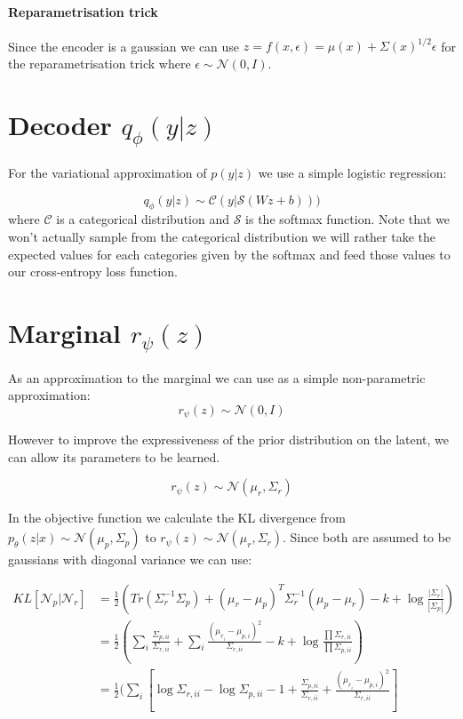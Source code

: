 \documentclass[10pt,oneside,openright]{report}
\begin{document}
\paragraph{Reparametrisation trick}
Since the encoder is a gaussian we can use  $z = f(x, \epsilon) =  \mu(x) + \Sigma(x)^{1/2} \epsilon$ for the reparametrisation trick where $\epsilon \sim \mathcal{N}(0, I)$. 
 
\section{Decoder $q_\phi(y|z)$}
For the variational approximation of $p(y|z)$ we use a simple logistic regression:

$$ q_\phi(y|z) \sim \mathcal{C}(y| \mathcal{S}(Wz + b)))$$ where $\mathcal{C}$ is a categorical distribution and $\mathcal{S}$ is the softmax function. Note that we won't actually sample from the categorical distribution we will rather take the expected values for each categories given by the softmax and feed those values to our cross-entropy loss function.

\section{Marginal $r_\psi(z)$}

As an approximation to the marginal we can use as a simple non-parametric approximation:
$$r_\psi(z) \sim \mathcal{N}(0, I)$$

However to improve the expressiveness of the prior distribution on the latent, we can allow its parameters to be learned. 

$$r_\psi(z) \sim \mathcal{N}(\mu_r, \Sigma_r)$$

In the objective function we calculate the KL divergence from $p_\theta(z|x) \sim \mathcal{N}(\mu_p, \Sigma_p)$ to $r_\psi(z) \sim \mathcal{N}(\mu_r, \Sigma_r)$. Since both are assumed to be gaussians with diagonal variance we can use:

\begin{align}
KL[\mathcal{N}_p| \mathcal{N}_r] &= \frac{1}{2}(Tr(\Sigma_r^{-1}\Sigma_p) + (\mu_r - \mu_p)^T\Sigma_r^{-1}(\mu_p - \mu_r) - k + \log\frac{|\Sigma_r|}{|\Sigma_p|})\\
&= \frac{1}{2}(\sum_i \frac{\Sigma_{p, ii}}{\Sigma_{r, ii}} + \sum_i \frac{(\mu_{r_i} - \mu_{p, i})^2}{\Sigma_{r, ii}} - k + \log\frac{\prod \Sigma_{r, ii}}{\prod \Sigma_{p, ii}})\\
&= \frac{1}{2}(\sum_i[ \log \Sigma_{r, ii} - \log \Sigma_{p, ii} - 1 + \frac{\Sigma_{p, ii}}{\Sigma_{r, ii}} + \frac{(\mu_{r_i} - \mu_{p, i})^2}{\Sigma_{r, ii}}]
\end{align}
\end{document}
